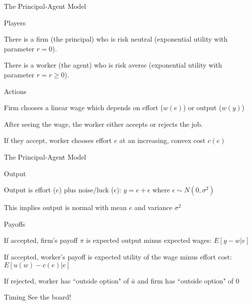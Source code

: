 \documentclass[aspectratio=169,usenames,dvipsnames]{beamer}
\newenvironment{wideitemize}{\itemize\addtolength{\itemsep}{10pt}}{\enditemize}
\begin{document}
\begin{frame}{The Principal-Agent Model}
\begin{block}{Players}
    \begin{wideitemize}
    \item There is a firm (the principal) who is risk neutral (exponential utility with parameter $r=0$).
    \item There is a worker (the agent) who is risk averse (exponential utility with parameter $r=r\geq 0$).
\end{wideitemize}
\end{block}
\begin{block}{Actions}
    \begin{wideitemize}
    \item Firm chooses a linear wage which depends on effort ($w(e)$) or output ($w(y)$)
    \item After seeing the wage, the worker either accepts or rejects the job.
    \item If they accept, worker chooses effort $e$ at an increasing, convex cost $c(e)$
\end{wideitemize}
\end{block}
\end{frame}
\begin{frame}{The Principal-Agent Model}
\begin{block}{Output}
    \begin{wideitemize}
    \item Output is effort ($e$) plus noise/luck ($\epsilon$): $y=e+\epsilon$ where $\epsilon\sim N(0,\sigma^2)$
    \item This implies output is normal with mean $e$ and variance $\sigma^2$
\end{wideitemize}
\end{block}
\begin{block}{Payoffs}
    \begin{wideitemize}
    \item If accepted, firm's payoff $\pi$ is expected output minus expected wages: $E[y-w|e]$
    \item If accepted, worker's payoff is expected utility of the wage minus effort cost: $E[u(w) -c(e)|e]$
    \item If rejected, worker has ``outside option" of $\bar u$ and firm has ``outside option" of 0
\end{wideitemize}
\end{block}
\end{frame}
\begin{frame}{Timing}
\centering
    \huge See the board!
\end{frame}
\end{document}
